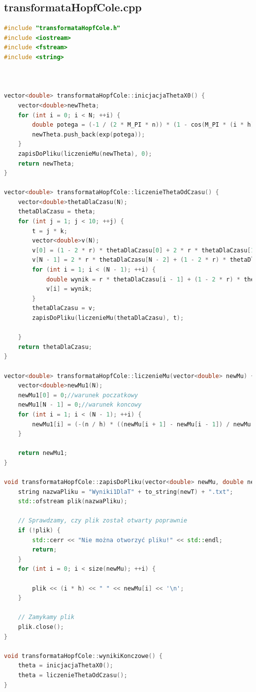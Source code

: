 \documentclass[a4paper,12pt]{article}
\begin{document}
\subsection{transformataHopfCole.cpp}
\begin{lstlisting}[caption={transformataHopfCole.cpp},label={transformataHopfColeCalyKod.cpp}, language=C++]
#include "transformataHopfCole.h"
#include <iostream>
#include <fstream>
#include <string>



vector<double> transformataHopfCole::inicjacjaThetaX0() {
	vector<double>newTheta;
	for (int i = 0; i < N; ++i) {
		double potega = (-1 / (2 * M_PI * n)) * (1 - cos(M_PI * (i * h)));
		newTheta.push_back(exp(potega));
	}
	zapisDoPliku(liczenieMu(newTheta), 0);
	return newTheta;
}

vector<double> transformataHopfCole::liczenieThetaOdCzasu() {
	vector<double>thetaDlaCzasu(N);
	thetaDlaCzasu = theta;
	for (int j = 1; j < 10; ++j) {
		t = j * k;
		vector<double>v(N);
		v[0] = (1 - 2 * r) * thetaDlaCzasu[0] + 2 * r * thetaDlaCzasu[1]; //warunki brzegowe  
		v[N - 1] = 2 * r * thetaDlaCzasu[N - 2] + (1 - 2 * r) * thetaDlaCzasu[N - 1];
		for (int i = 1; i < (N - 1); ++i) {
			double wynik = r * thetaDlaCzasu[i - 1] + (1 - 2 * r) * thetaDlaCzasu[i] + r * thetaDlaCzasu[i + 1];
			v[i] = wynik;
		}
		thetaDlaCzasu = v;
		zapisDoPliku(liczenieMu(thetaDlaCzasu), t);
		
	}
	return thetaDlaCzasu;
}

vector<double> transformataHopfCole::liczenieMu(vector<double> newMu) {
	vector<double>newMu1(N);
	newMu1[0] = 0;//warunek poczatkowy
	newMu1[N - 1] = 0;//warunek koncowy
	for (int i = 1; i < (N - 1); ++i) {
		newMu1[i] = (-(n / h) * ((newMu[i + 1] - newMu[i - 1]) / newMu[i]));
	}
	
	return newMu1;
}

void transformataHopfCole::zapisDoPliku(vector<double> newMu, double newT) {
	string nazwaPliku = "Wyniki1DlaT" + to_string(newT) + ".txt";
	std::ofstream plik(nazwaPliku);
	
	// Sprawdzamy, czy plik został otwarty poprawnie
	if (!plik) {
		std::cerr << "Nie można otworzyć pliku!" << std::endl;
		return;
	}
	for (int i = 0; i < size(newMu); ++i) {
		
		plik << (i * h) << " " << newMu[i] << '\n';
	}
	
	// Zamykamy plik
	plik.close();
}

void transformataHopfCole::wynikiKonczowe() {
	theta = inicjacjaThetaX0();
	theta = liczenieThetaOdCzasu();
}

\end{lstlisting}
\end{document}
